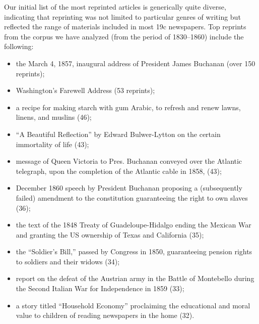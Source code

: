 \documentclass[pdftex,11pt]{article}
\begin{document}
Our initial list of the most reprinted articles is generically quite
diverse, indicating that reprinting was not limited to particular
genres of writing but reflected the range of materials included in
most 19c newspapers.  Top reprints from the corpus we have analyzed
(from the period of 1830--1860) include the following:
\begin{itemize}

\item the March 4, 1857, inaugural address of President James Buchanan
  (over 150 reprints);

\item Washington's Farewell Address (53 reprints);

\item a recipe for making starch with gum Arabic, to refresh and renew
  lawns, linens, and muslins (46);

\item ``A Beautiful Reflection'' by Edward Bulwer-Lytton on the
  certain immortality of life (43);

\item message of Queen Victoria to Pres. Buchanan conveyed
  over the Atlantic telegraph, upon the completion of the Atlantic
  cable in 1858, (43);

\item December 1860 speech by President Buchanan proposing a
  (subsequently failed) amendment to the constitution guaranteeing the
  right to own slaves (36);

\item the text of the 1848 Treaty of Guadeloupe-Hidalgo ending
  the Mexican War and granting the US ownership of Texas and California
  (35);

\item the ``Soldier's Bill,'' passed by Congress in 1850, guaranteeing
  pension rights to soldiers and their widows (34);

\item report on the defeat of the Austrian army in the Battle of
  Montebello during the Second Italian War for Independence in 1859
  (33);

\item a story titled ``Household Economy'' proclaiming the educational
  and moral value to children of reading newspapers in the home (32).

\end{itemize}
\end{document}

